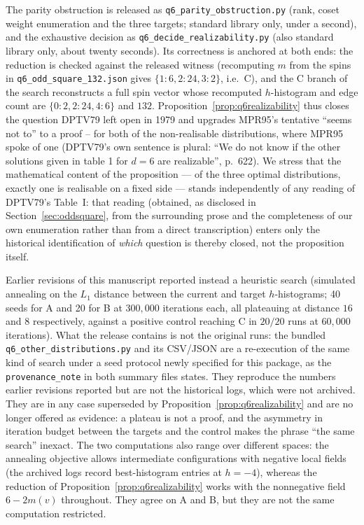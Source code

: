 \documentclass[12pt,a4paper]{article}
\theoremstyle{definition}
\begin{document}
The parity obstruction is released as
\texttt{q6\_parity\_obstruction.py} (rank, coset weight enumeration and the
three targets; standard library only, under a second), and the exhaustive
decision as \texttt{q6\_decide\_realizability.py} (also standard library only,
about twenty seconds).
Its correctness is anchored at both ends: the reduction is checked against the
released witness (recomputing $m$ from the spins in
\texttt{q6\_odd\_square\_132.json} gives $\{1{:}6,2{:}24,3{:}2\}$, i.e.\ C), and
the C branch of the search reconstructs a full spin vector whose recomputed
$h$-histogram and edge count are $\{0{:}2,2{:}24,4{:}6\}$ and $132$.
Proposition~\ref{prop:q6realizability} thus closes the question DPTV79 left open
in 1979 and upgrades MPR95's tentative ``seems not to'' to a proof --
for both of the non-realisable distributions, where MPR95 spoke of one
(DPTV79's own sentence is plural: ``We do not know if the other solutions
given in table 1 for $d=6$ are realizable'', p.~622). We stress that the
mathematical content of the proposition --- of the three optimal
distributions, exactly one is realisable on a fixed side --- stands
independently of any reading of DPTV79's Table~I: that reading (obtained,
as disclosed in Section~\ref{sec:oddsquare}, from the surrounding prose
and the completeness of our own enumeration rather than from a direct
transcription) enters only the historical identification of \emph{which}
question is thereby closed, not the proposition itself.

Earlier revisions of this manuscript reported instead a heuristic search
(simulated annealing on the $L_1$ distance between the current and target
$h$-histograms; 40 seeds for A and 20 for B at $300{,}000$ iterations each,
all plateauing at distance $16$ and $8$ respectively, against a positive control
reaching C in $20/20$ runs at $60{,}000$ iterations). What the release contains is not the original runs: the bundled
\texttt{q6\_other\_distributions.py} and its CSV/JSON are a re-execution of the
same kind of search under a seed protocol newly specified for this package, as
the \texttt{provenance\_note} in both summary files states. They reproduce the
numbers earlier revisions reported but are not the historical logs, which were
not archived. They are in any case superseded by
Proposition~\ref{prop:q6realizability} and are no longer offered as evidence:
a plateau is not a proof, and the asymmetry in iteration budget between the
targets and the control makes the phrase ``the same search'' inexact. The two
computations also range over different spaces: the annealing objective allows
intermediate configurations with negative local fields (the archived logs
record best-histogram entries at $h=-4$), whereas the reduction of
Proposition~\ref{prop:q6realizability} works with the nonnegative field
$6-2m(v)$ throughout. They agree on A and B, but they are not the same
computation restricted.
\end{document}
